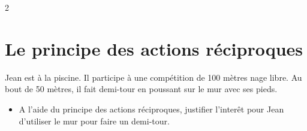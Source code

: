 \documentclass[a4paper,11pt,fleqn]{article}%
\begin{document}
\begin{multicols}{2}
\section{Le principe des actions réciproques}
Jean est à la piscine. Il participe à une compétition de 100 mètres nage libre. Au bout de 50 mètres, il fait demi-tour en poussant sur le mur avec ses pieds.
\begin{itemize}
    \item A l'aide du principe des actions réciproques, justifier l'interêt pour Jean d'utiliser le mur pour faire un demi-tour.
\end{itemize}
\end{multicols}
\end{document}
